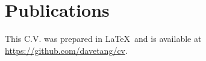 \documentclass[letterpaper, 10pt]{article}
\begin{document}

\section*{Publications}
\begingroup
   \renewcommand{\section}[2]{}
   
   \nocite{*}
   
\endgroup

\vfill

\footnotesize
This C.V. was prepared in \LaTeX\ and is available at \href{https://github.com/davetang/cv}{https://github.com/davetang/cv}.
\end{document}
